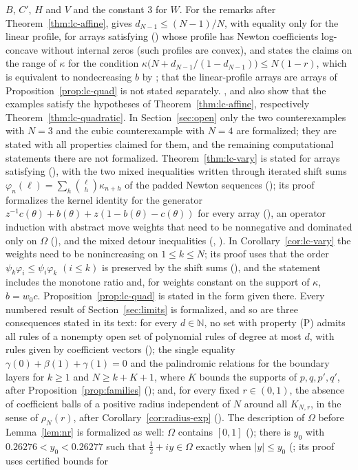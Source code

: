 \documentclass[twoside,10pt]{article}
\numberwithin{equation}{section}
\theoremstyle{slbody}
\theoremstyle{definition}
\theoremstyle{remark}
\renewcommand{\eqref}[1]{\textup{{\normalfont(\oldstylenums{\ref{#1}}}\normalfont)}}
\begin{document}
$B$, $C'$, $H$ and $V$ and the constant $3$ for $W$. For the remarks after Theorem~\ref{thm:lc-affine},  gives $d_{N-1}\leq(N-1)/N$, with equality only for the linear profile, for arrays satisfying \eqref{eq:basic} whose profile has Newton coefficients log-concave without internal zeros (such profiles are convex), and  states the claims on the range of $\kappa$ for the condition $\kappa\bigl(N+d_{N-1}/(1-d_{N-1})\bigr)\leq N(1-r)$, which is equivalent to nondecreasing $b$ by ; that the linear-profile arrays are arrays of Proposition~\ref{prop:lc-quad} is not stated separately. ,  and  also show that the examples satisfy the hypotheses of Theorem~\ref{thm:lc-affine}, respectively Theorem~\ref{thm:lc-quadratic}. In Section~\ref{sec:open} only the two counterexamples with $N=3$ and the cubic counterexample with $N=4$ are formalized; they are stated with all properties claimed for them, and the remaining computational statements there are not formalized. Theorem~\ref{thm:lc-vary} is stated for arrays satisfying \eqref{eq:basic}, with the two mixed inequalities written through iterated shift sums $\varphi_n(\ell)=\sum_h\binom\ell h\kappa_{n+h}$ of the padded Newton sequences (); its proof formalizes the kernel identity for the generator $z^{-1}c(\theta)+b(\theta)+z(1-b(\theta)-c(\theta))$ for every array (), an operator induction with abstract move weights that need to be nonnegative and dominated only on $\Omega$ (), and the mixed detour inequalities (, ). In Corollary~\ref{cor:lc-vary} the weights need to be nonincreasing on $1\leq k\leq N$; its proof uses that the order $\psi_k\varphi_i\leq\psi_i\varphi_k$ $(i\leq k)$ is preserved by the shift sums (), and the statement includes the monotone ratio and, for weights constant on the support of $\kappa$, $b=w_0c$. Proposition~\ref{prop:lc-quad} is stated in the form given there. Every numbered result of Section~\ref{sec:limits} is formalized, and so are three consequences stated in its text: for every $d\in\mathbb N$, no set with property (P) admits all rules of a nonempty open set of polynomial rules of degree at most $d$, with rules given by coefficient vectors (); the single equality $\gamma(0)+\beta(1)+\gamma(1)=0$ and the palindromic relations for the boundary layers for $k\geq1$ and $N\geq k+K+1$, where $K$ bounds the supports of $p,q,p',q'$, after Proposition~\ref{prop:families} (); and, for every fixed $r\in(0,1)$, the absence of coefficient balls of a positive radius independent of $N$ around all $K_{N,r}$, in the sense of $\rho_N(r)$, after Corollary~\ref{cor:radius-exp} (). The description of $\Omega$ before Lemma~\ref{lem:nr} is formalized as well: $\Omega$ contains $[0,1]$ (); there is $y_0$ with $0.26276<y_0<0.26277$ such that $\tfrac12+iy\in\Omega$ exactly when $|y|\leq y_0$ (; its proof uses certified bounds for 
\end{document}
